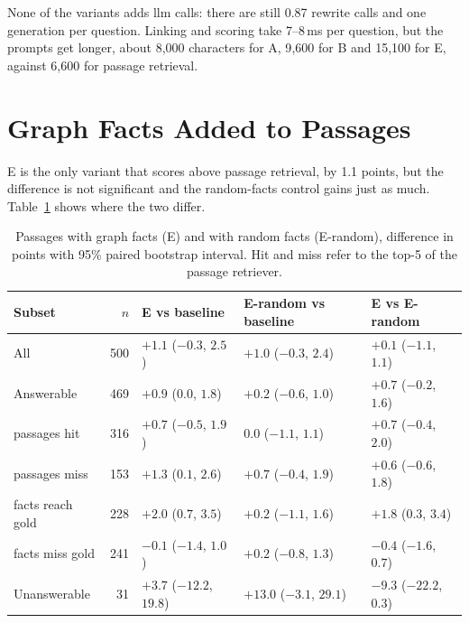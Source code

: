 None of the variants adds \gls{llm} calls: there are still 0.87 rewrite calls and one
generation per question. Linking and scoring take 7--8\,ms per question, but the prompts
get longer, about 8{,}000 characters for A, 9{,}600 for B and 15{,}100 for E, against
6{,}600 for passage retrieval.


\section{Graph Facts Added to Passages}\label{sec:kgret:facts}

E is the only variant that scores above passage retrieval, by 1.1 \fone{} points, but the
difference is not significant and the random-facts control gains just as much.
Table~\ref{tab:kgret:facts} shows where the two differ.

\begin{table}[ht]
    \centering
    \caption{Passages with graph facts (E) and with random facts (E-random), \fone{}
    difference in points with 95\% paired bootstrap interval. Hit and miss refer to the
    top-5 of the passage retriever.}
    \label{tab:kgret:facts}
    \small
    \begin{tabular}{lrlll}
        \toprule
        Subset & $n$ & E vs baseline & E-random vs baseline & E vs E-random \\
        \midrule
        All                    & 500 & $+1.1$ ($-0.3$, $2.5$)  & $+1.0$ ($-0.3$, $2.4$)  & $+0.1$ ($-1.1$, $1.1$) \\
        Answerable             & 469 & $+0.9$ ($0.0$, $1.8$)   & $+0.2$ ($-0.6$, $1.0$)  & $+0.7$ ($-0.2$, $1.6$) \\
        \quad passages hit     & 316 & $+0.7$ ($-0.5$, $1.9$)  & $0.0$ ($-1.1$, $1.1$)   & $+0.7$ ($-0.4$, $2.0$) \\
        \quad passages miss    & 153 & $+1.3$ ($0.1$, $2.6$)   & $+0.7$ ($-0.4$, $1.9$)  & $+0.6$ ($-0.6$, $1.8$) \\
        \quad facts reach gold & 228 & $+2.0$ ($0.7$, $3.5$)   & $+0.2$ ($-1.1$, $1.6$)  & $+1.8$ ($0.3$, $3.4$) \\
        \quad facts miss gold  & 241 & $-0.1$ ($-1.4$, $1.0$)  & $+0.2$ ($-0.8$, $1.3$)  & $-0.4$ ($-1.6$, $0.7$) \\
        Unanswerable           &  31 & $+3.7$ ($-12.2$, $19.8$) & $+13.0$ ($-3.1$, $29.1$) & $-9.3$ ($-22.2$, $0.3$) \\
        \bottomrule
    \end{tabular}
\end{table}

